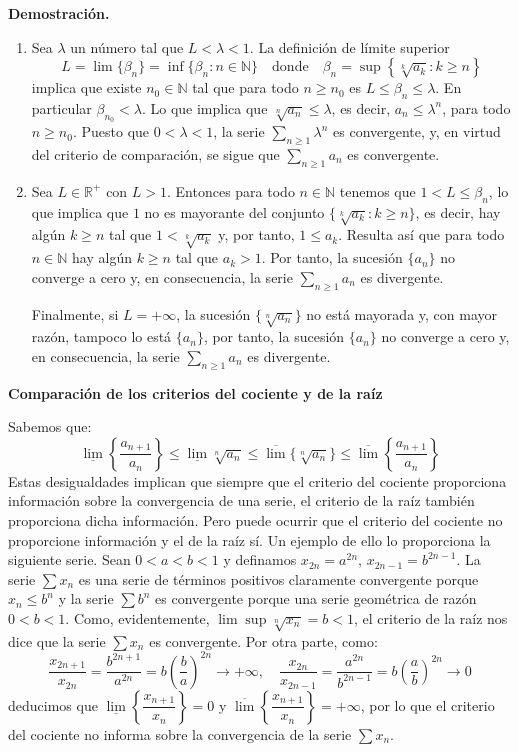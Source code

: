 \documentclass[10pt,a4paper]{article}
\begin{document}
	\textbf{Demostración. }
	\begin{enumerate}[label = \alph*)]
		\item Sea $\lambda$ un número tal que $L < \lambda < 1$. La definición de límite superior
		$$L = \lim\{\beta_n\} = \inf\{\beta_n:n \in \mathbb{N}\} \quad \text{donde} \quad \beta_n = \sup\left\{\sqrt[k]{a_k}: k \geq n\right\}$$
		implica que existe $n_0 \in \mathbb{N}$ tal que para todo $n \geq n_0$ es $L \leq \beta_n \leq \lambda$. En particular $\beta_{n_0} < \lambda$. Lo que implica que $\sqrt[n]{a_n} \leq \lambda$, es decir, $a_n \leq \lambda ^n$, para todo $n \geq n_0$. Puesto que $0 < \lambda < 1$, la serie $\displaystyle \sum_{n \geq 1} \lambda ^n $ es convergente, y, en virtud del criterio de comparación, se sigue que $\displaystyle \sum_{n \geq 1} a_n$ es convergente.
		\item Sea $L \in \mathbb{R}^+$ con $L > 1$. Entonces para todo $n \in \mathbb{N}$ tenemos que $1 < L \leq \beta_n$, lo que implica que $1$ no es mayorante del conjunto $\{\sqrt[k]{a_k}:k \geq n\}$, es decir, hay algún $k \geq n$ tal que $1 < \sqrt[k]{a_k}$ y, por tanto, $1 \leq a_k$. Resulta así que para todo $n \in \mathbb{N}$ hay algún $k \geq n$ tal que $a_k > 1$. Por tanto, la sucesión $\{a_n\}$ no converge a cero y, en consecuencia, la serie $\displaystyle \sum_{n \geq 1} a_n$ es divergente.
		
		Finalmente, si $L = + \infty$, la sucesión $\{\sqrt[n]{a_n}\}$ no está mayorada y, con mayor razón, tampoco lo está $\{a_n\}$, por tanto, la sucesión $\{a_n\}$ no converge a cero y, en consecuencia, la serie $\displaystyle \sum_{n \geq 1}a_n$ es divergente.
	\end{enumerate}
	
	\textbf{\Large{Comparación de los criterios del cociente y de la raíz}}
	
	Sabemos que:
	$$\underline\lim\left\{\dfrac{a_{n+1}}{a_n}\right\} \leq \underline\lim{\sqrt[n]{a_n}} \leq \overline\lim\{\sqrt[n]{a_n}\} \leq \overline\lim\left\{\dfrac{a_{n+1}}{a_n}\right\}$$
	Estas desigualdades implican que siempre que el criterio del cociente proporciona información	sobre la convergencia de una serie, el criterio de la raíz también proporciona dicha información. Pero puede ocurrir que el criterio del cociente no proporcione información y el de la raíz sí. Un
	ejemplo de ello lo proporciona la siguiente serie. Sean $0 < a < b < 1$ y definamos $x_{2n} = a^{2n}$, $x_{2n-1} = b^{2n-1}$. La serie $\sum x_n$ es una serie de términos positivos claramente convergente porque $x_n \leq b^n$ y la serie $\sum b^n$ es convergente porque una serie geométrica de razón $0 < b < 1$. Como, evidentemente, $\lim \sup \sqrt[n]{x_n} = b < 1$, el criterio de la raíz nos dice que la serie $\sum x_n$ es convergente. Por otra parte, como:
	$$\dfrac{x_{2n+1}}{x_{2n}} = \dfrac{b^{2n+1}}{a^{2n}} = b \left(\dfrac{b}{a}\right) ^{2n} \rightarrow + \infty, \quad \dfrac{x_{2n}}{x_{2n-1}} = \dfrac{a^{2n}}{b^{2n-1}} = b \left(\dfrac{a}{b}\right)^{2n} \rightarrow 0$$
	deducimos que $\underline{\lim} \left\{\dfrac{x_{n+1}}{x_n}\right\} = 0$ y $\overline{\lim} \left\{\dfrac{x_{n+1}}{x_n}\right\} = + \infty$, por lo que el criterio del cociente no informa sobre la convergencia de la serie $\sum x_n$.
	
\end{document}
